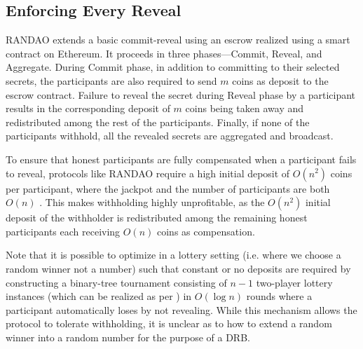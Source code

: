 \documentclass[letterpaper,twocolumn,10pt]{article}
\theoremstyle{definition}
\theoremstyle{remark}
\begin{document}
\subsection{Enforcing Every Reveal}
RANDAO \cite{youcai2017randao} extends a basic commit-reveal using an escrow realized using a smart contract on Ethereum. It proceeds in three phases---Commit, Reveal, and Aggregate. During Commit phase, in addition to committing to their selected secrets, the participants are also required to send $m$ coins as deposit to the escrow contract. Failure to reveal the secret during Reveal phase by a participant results in the corresponding deposit of $m$ coins being taken away and redistributed among the rest of the participants. Finally, if none of the participants withhold, all the revealed secrets are aggregated and broadcast.

To ensure that honest participants are fully compensated when a participant fails to reveal, protocols like RANDAO require a high initial deposit of $O(n^2)$ coins per participant, where the jackpot and the number of participants are both $O(n)$ \cite{andrychowicz2014secure, bentov2014use}. This makes withholding highly unprofitable, as the $O(n^2)$ initial deposit of the withholder is redistributed among the remaining honest participants each receiving $O(n)$ coins as compensation.

Note that it is possible to optimize in a lottery setting (i.e. where we choose a random winner not a number) such that constant or no deposits are required \cite{bartoletti2017constant, miller2017zero} by constructing a binary-tree tournament consisting of $n - 1$ two-player lottery instances (which can be realized as per \cite{andrychowicz2014fair, andrychowicz2014secure}) in $O(\log n)$ rounds where a participant automatically loses by not revealing. While this mechanism allows the protocol to tolerate withholding, it is unclear as to how to extend a random winner into a random number for the purpose of a DRB.
\end{document}
